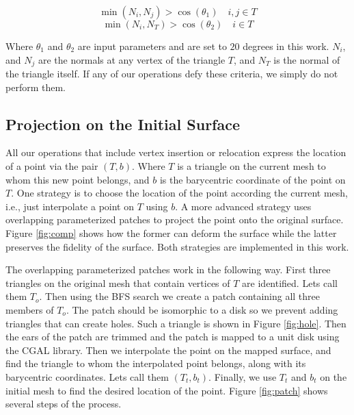 \documentclass[letter,11pt]{article}
\begin{document}
\[\min(N_i,N_j) > \cos(\theta_1) \quad i,j \in T \]
\[\min(N_i,N_T) > \cos(\theta_2) \quad i \in T \]

Where $\theta_1$ and $\theta_2$ are input parameters and are set to
$20$ degrees in this work. $N_i$, and $N_j$ are the normals at any
vertex of the triangle $T$, and $N_T$ is the normal of the triangle
itself. If any of our operations defy these criteria, we simply do not
perform them.

\subsection*{Projection on the Initial Surface}

All our operations that include vertex insertion or relocation express
the location of a point via the pair $(T,b)$. Where $T$ is a
triangle on the current mesh to whom this new point belongs, and $b$
is the barycentric coordinate of the point on $T$. One strategy is to
choose the location of the point according the current mesh, i.e.,
just interpolate a point on $T$ using $b$. A more advanced strategy
uses overlapping parameterized patches to project the point onto the
original surface. Figure \ref{fig:comp} shows how the former can
deform the surface while the latter preserves the fidelity of the
surface. Both strategies are implemented in this work.

The overlapping parameterized patches work in the following way. First
three triangles on the original mesh that contain vertices of $T$ are
identified. Lets call them $T_o$. Then using the BFS search we create
a patch containing all three members of $T_o$. The patch should be
isomorphic to a disk so we prevent adding triangles that can create
holes. Such a triangle is shown in Figure \ref{fig:hole}. Then the
ears of the patch are trimmed and the patch is mapped to a unit disk
using the CGAL\cite{cgal} library. Then we interpolate the point on the
mapped surface, and find the triangle to whom the interpolated point
belongs, along with its barycentric coordinates. Lets call them $(T_t,
b_t)$. Finally, we use $T_t$ and $b_t$ on the initial mesh to find the
desired location of the point. Figure \ref{fig:patch} shows several
steps of the process.
\end{document}
